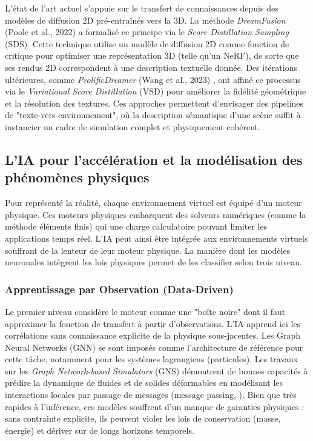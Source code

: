 L'état de l'art actuel s'appuie sur le transfert de connaissances depuis des modèles de diffusion 2D pré-entraînés vers la 3D. La méthode \textit{DreamFusion} (Poole et al., 2022) \cite{poole_dreamfusion_2022} a formalisé ce principe via le \textit{Score Distillation Sampling} (SDS). Cette technique utilise un modèle de diffusion 2D comme fonction de critique pour optimiser une représentation 3D (telle qu'un NeRF), de sorte que ses rendus 2D correspondent à une description textuelle donnée. Des itérations ultérieures, comme \textit{ProlificDreamer} (Wang et al., 2023) \cite{wang_prolificdreamer_2023}, ont affiné ce processus via le \textit{Variational Score Distillation} (VSD) pour améliorer la fidélité géométrique et la résolution des textures. Ces approches permettent d'envisager des pipelines de "texte-vers-environnement", où la description sémantique d'une scène suffit à instancier un cadre de simulation complet et physiquement cohérent.


\subsection{L'IA pour l'accélération et la modélisation des phénomènes physiques}

Pour représenté la réalité, chaque environnement virtuel est équipé d'un moteur physique. Ces moteurs physiques embarquent des solveurs numériques (comme la méthode éléments finis) qui une charge calculatoire pouvant limiter les applications temps réel. L'IA peut ainsi être intégrée aux environnements virtuels souffrant de la lenteur de leur moteur physique. La manière dont les modèles neuronales intègrent les lois physiques permet de les classifier selon trois niveau.

\subsubsection{Apprentissage par Observation (Data-Driven)}
Le premier niveau considère le moteur comme une "boîte noire" dont il faut approximer la fonction de transfert à partir d'observations. L'IA apprend ici les corrélations sans connaissance explicite de la physique sous-jacentes. Les Graph Neural Networks (GNN) se sont imposés comme l'architecture de référence pour cette tâche, notamment pour les systèmes lagrangiens (particules). Les travaux sur les \textit{Graph Network-based Simulators} (GNS) \cite{sanchez-gonzalez_learning_2020} démontrent de bonnes capacités à prédire la dynamique de fluides et de solides déformables en modélisant les interactions locales par passage de messages (message passing, \cite{scarselli_graph_2008}). Bien que très rapides à l'inférence, ces modèles souffrent d'un manque de garanties physiques : sans contrainte explicite, ils peuvent violer les lois de conservation (masse, énergie) et dériver sur de longs horizons temporels.

